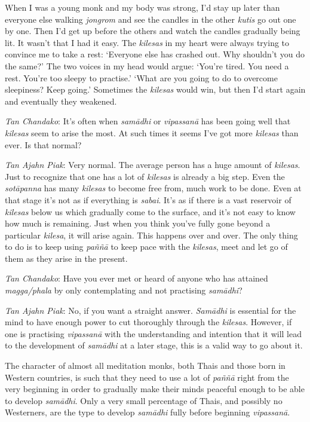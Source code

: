 When I was a young monk and my body was strong, I'd stay up later than
everyone else walking \emph{jongrom} and see the candles in the other
\emph{kutis} go out one by one. Then I'd get up before the others and
watch the candles gradually being lit. It wasn't that I had it easy. The
\emph{kilesas} in my heart were always trying to convince me to take a
rest: `Everyone else has crashed out. Why shouldn't you do the same?'
The two voices in my head would argue: `You're tired. You need a rest. 
You're too sleepy to practise.' `What are you going to do to overcome
sleepiness? Keep going.' Sometimes the \emph{kilesas} would win, but
then I'd start again and eventually they weakened. 

\emph{Tan Chandako}: It's often when \emph{samādhi} or \emph{vipassanā}
has been going well that \emph{kilesas} seem to arise the most. At such
times it seems I've got more \emph{kilesas} than ever. Is that normal? 

\emph{Tan Ajahn Piak}: Very normal. The average person has a huge amount
of \emph{kilesas}. Just to recognize that one has a lot of
\emph{kilesas} is already a big step. Even the \emph{sotāpanna} has many
\emph{kilesas} to become free from, much work to be done. Even at that
stage it's not as if everything is \emph{sabai}. It's as if there is a
vast reservoir of \emph{kilesas} below us which gradually come to the
surface, and it's not easy to know how much is remaining. Just when you
think you've fully gone beyond a particular \emph{kilesa}, it will arise
again. This happens over and over. The only thing to do is to keep using
\emph{paññā} to keep pace with the \emph{kilesas}, meet and let go of
them as they arise in the present. 

\emph{Tan Chandako}: Have you ever met or heard of anyone who has
attained \emph{magga/phala} by only contemplating and not practising
\emph{samādhi}? 

\emph{Tan Ajahn Piak}: No, if you want a straight answer. \emph{Samādhi}
is essential for the mind to have enough power to cut thoroughly through
the \emph{kilesas}. However, if one is practising \emph{vipassanā} with
the understanding and intention that it will lead to the development of
\emph{samādhi} at a later stage, this is a valid way to go about it. 

The character of almost all meditation monks, both Thais and those born
in Western countries, is such that they need to use a lot of
\emph{paññā} right from the very beginning in order to gradually make
their minds peaceful enough to be able to develop \emph{samādhi}. Only a
very small percentage of Thais, and possibly no Westerners, are the type
to develop \emph{samādhi} fully before beginning \emph{vipassanā}. 

